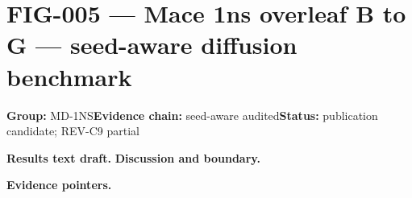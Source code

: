 \clearpage
\section{FIG-005 --- Mace 1ns overleaf B to G — seed-aware diffusion benchmark}
\label{figpage:fig-005}
\textbf{Group:} MD-1NS\quad \textbf{Evidence chain:} seed-aware audited\quad \textbf{Status:} publication candidate; REV-C9 partial

\textbf{Results text draft.} 
\textbf{Discussion and boundary.} 


\textbf{Evidence pointers.}



\vfill
